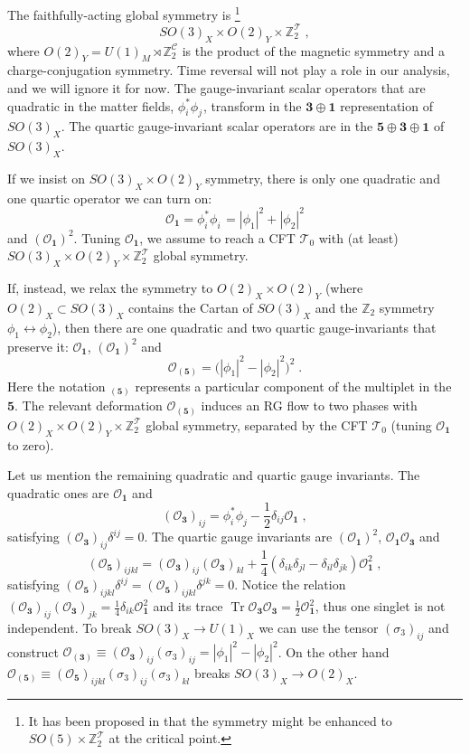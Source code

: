 \documentclass[a4paper, 12pt]{article}
\newcommand{\rep}[1]{\ensuremath{\mathbf{#1}}}
\numberwithin{equation}{section}
\newcommand{\be}{\begin{equation}} \newcommand{\ee}{\end{equation}}
\newcommand{\cC}{\mathcal{C}}
\newcommand{\cO}{\mathcal{O}}
\newcommand{\cT}{\mathcal{T}}
\newcommand{\bZ}{\mathbb{Z}}
\DeclareMathOperator{\Tr}{Tr}
\begin{document}
The faithfully-acting global symmetry is%
\footnote{It has been proposed in \cite{Wang:2017txt} that the symmetry might be enhanced to $SO(5) \times \bZ_2^\cT$ at the critical point.}
\be
SO(3)_X \times O(2)_Y \times \bZ_2^\cT \;,
\ee
where $O(2)_Y = U(1)_M \rtimes \bZ_2^\cC$ is the product of the magnetic symmetry and a charge-conjugation symmetry. Time reversal will not play a role in our analysis, and we will ignore it for now. The gauge-invariant scalar operators that are quadratic in the matter fields, $\phi^*_i \phi^{\phantom{*}}_j$, transform in the $\rep{3} \oplus \rep{1}$ representation of $SO(3)_X$. The quartic gauge-invariant scalar operators are in the $\rep{5} \oplus \rep{3} \oplus \rep{1}$ of $SO(3)_X$.

If we insist on $SO(3)_X \times O(2)_Y$ symmetry, there is only one quadratic and one quartic operator we can turn on:
\be
\label{rel ops SO(3) O(2)}
\cO_\rep1 = \phi_i^* \phi_i^{\phantom{*}} = |\phi_1|^2 + |\phi_2|^2
\ee
and $(\cO_\rep1)^2$. Tuning $\cO_\rep1$, we assume to reach a CFT $\cT_0$ with (at least) $SO(3)_X \times O(2)_Y \times \bZ_2^\cT$ global symmetry.

If, instead, we relax the symmetry to $O(2)_X \times O(2)_Y$ (where $O(2)_X \subset SO(3)_X$ contains the Cartan of $SO(3)_X$ and the $\bZ_2$ symmetry $\phi_1 \leftrightarrow\phi_2$), then there are one quadratic and two quartic gauge-invariants that preserve it: $\cO_\rep1$, $(\cO_\rep1)^2$ and
\be
\cO_{(\rep5)} = \big( |\phi_1|^2 - |\phi_2|^2 \big)^2 \;.
\ee
Here the notation ${}_{(\rep5)}$ represents a particular component of the multiplet in the \rep5. The relevant deformation $\cO_{(\rep5)}$ induces an RG flow to two phases with $O(2)_X \times O(2)_Y \times \bZ_2^\cT$ global symmetry, separated by the CFT $\cT_0$ (tuning $\cO_\rep1$ to zero).

Let us mention the remaining quadratic and quartic gauge invariants. The quadratic ones are $\cO_\rep1$ and
\be
(\cO_\rep3)_{ij} = \phi_i^* \phi_j - \frac12 \delta_{ij} \cO_\rep1 \;,
\ee
satisfying $(\cO_\rep3)_{ij} \delta^{ij} = 0$. The quartic gauge invariants are $(\cO_\rep1)^2$, $\cO_\rep1 \cO_\rep3$ and
\be
(\cO_\rep5)_{ijkl} = (\cO_\rep3)_{ij} (\cO_\rep3)_{kl} + \frac14 (\delta_{ik} \delta_{jl} - \delta_{il} \delta_{jk}) \cO_\rep1^2 \;,
\ee
satisfying $(\cO_\rep5)_{ijkl} \delta^{ij} = (\cO_\rep5)_{ijkl} \delta^{jk} = 0$. Notice the relation $(\cO_\rep3)_{ij} (\cO_\rep3)_{jk} = \frac14 \delta_{ik} \cO_\rep1^2$ and its trace $\Tr \cO_\rep3 \cO_\rep3 = \frac12 \cO_\rep1^2$, thus one singlet is not independent. To break $SO(3)_X \to U(1)_X$ we can use the tensor $(\sigma_3)_{ij}$ and construct $\cO_{(\rep3)} \equiv (\cO_\rep3)_{ij} (\sigma_3)_{ij} = |\phi_1|^2 - |\phi_2|^2$. On the other hand $\cO_{(\rep5)} \equiv (\cO_\rep5)_{ijkl} (\sigma_3)_{ij} (\sigma_3)_{kl}$ breaks $SO(3)_X \to O(2)_X$.
\end{document}
